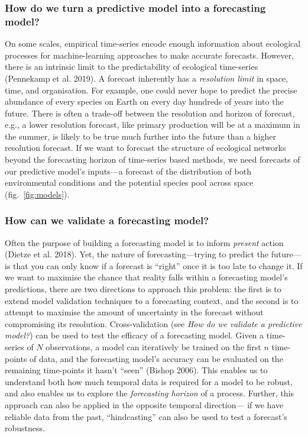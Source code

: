 \documentclass[11pt]{article}
\begin{document}
\hypertarget{how-do-we-turn-a-predictive-model-into-a-forecasting-model}{%
\subsubsection{How do we turn a predictive model into a forecasting
model?}\label{how-do-we-turn-a-predictive-model-into-a-forecasting-model}}

On some scales, empirical time-series encode enough information about
ecological processes for machine-learning approaches to make accurate
forecasts. However, there is an intrinsic limit to the predictability of
ecological time-series (Pennekamp et al. 2019). A forecast inherently
has a \emph{resolution limit} in space, time, and organisation. For
example, one could never hope to predict the precise abundance of every
species on Earth on every day hundreds of years into the future. There
is often a trade-off between the resolution and horizon of forecast,
e.g., a lower resolution forecast, like primary production will be at a
maximum in the summer, is likely to be true much further into the future
than a higher resolution forecast. If we want to forecast the structure
of ecological networks beyond the forecasting horizon of time-series
based methods, we need forecasts of our predictive model's inputs---a
forecast of the distribution of both environmental conditions and the
potential species pool across space (fig.~\ref{fig:models}).

\hypertarget{how-can-we-validate-a-forecasting-model}{%
\subsubsection{How can we validate a forecasting
model?}\label{how-can-we-validate-a-forecasting-model}}

Often the purpose of building a forecasting model is to inform
\emph{present} action (Dietze et al. 2018). Yet, the nature of
forecasting---trying to predict the future---is that you can only know
if a forecast is ``right'' once it is too late to change it. If we want
to maximise the chance that reality falls within a forecasting model's
predictions, there are two directions to approach this problem: the
first is to extend model validation techniques to a forecasting context,
and the second is to attempt to maximise the amount of uncertainty in
the forecast without compromising its resolution. Cross-validation (see
\emph{How do we validate a predictive model?}) can be used to test the
efficacy of a forecasting model. Given a time-series of \(N\)
observations, a model can iteratively be trained on the first \(n\)
time-points of data, and the forecasting model's accuracy can be
evaluated on the remaining time-points it hasn't ``seen'' (Bishop 2006).
This enables us to understand both how much temporal data is required
for a model to be robust, and also enables us to explore the
\emph{forecasting horizon} of a process. Further, this approach can also
be applied in the opposite temporal direction--- if we have reliable
data from the past, ``hindcasting'' can also be used to test a
forecast's robustness.
\end{document}
